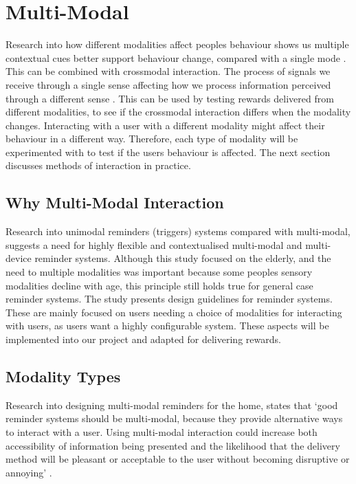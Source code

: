 
\newpage

\section{Multi-Modal}
Research into how different modalities affect peoples behaviour shows us multiple contextual cues better support behaviour change, compared with a single mode \cite{article_understanding_use_contextual_cues_design_impl}. This can be combined with crossmodal interaction. The process of signals we receive through a single sense affecting how we process information perceived through a different sense \cite{article_natural_cross_modal_mappings}. This can be used by testing rewards delivered from different modalities, to see if the crossmodal interaction differs when the modality changes.\newline
\newline
Interacting with a user with a different modality might affect their behaviour in a different way. Therefore, each type of modality will be experimented with to test if the users behaviour is affected. The next section discusses methods of interaction in practice.

\subsection{Why Multi-Modal Interaction}
Research \cite{article_user_centred_multimodal_reminders} into unimodal reminders (triggers) systems compared with multi-modal, suggests a need for highly flexible and contextualised multi-modal and multi-device reminder systems. Although this study focused on the elderly, and the need to multiple modalities was important because some peoples sensory modalities decline with age, this principle still holds true for general case reminder systems. The study presents design guidelines for reminder systems. These are mainly focused on users needing a choice of modalities for interacting with users, as users want a highly configurable system. These aspects will be implemented into our project and adapted for delivering rewards.

\subsection{Modality Types}
Research into designing multi-modal reminders for the home, states that `good reminder systems should be multi-modal, because they provide alternative ways to interact with a user. Using multi-modal interaction could increase both accessibility of information being presented and the likelihood that the delivery method will be pleasant or acceptable to the user without becoming disruptive or annoying' \cite{article_designing_multimodal_reminders_for_home}.

